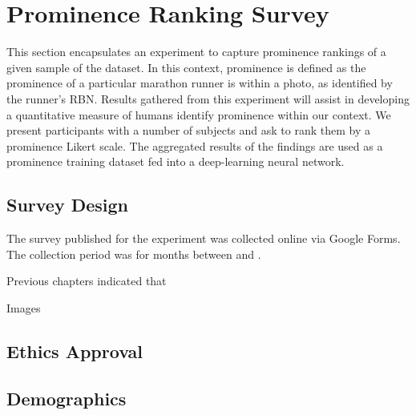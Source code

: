 \section{Prominence Ranking Survey}
\label{sec:prominence_rank_survey}

This section encapsulates an experiment to capture prominence rankings of a given sample of the dataset.
In this context, prominence is defined as the prominence of a particular marathon runner is within a photo, as identified by the runner's RBN.  
Results gathered from this experiment will assist in developing a quantitative measure of humans identify prominence within our context.
We present participants with a number of subjects and ask to rank them by a prominence Likert scale.
The aggregated results of the findings are used as a prominence training dataset fed into a deep-learning neural network.

\subsection{Survey Design}
\label{sec:prominence_rank_survey_design}

The survey published for the experiment was collected online via Google Forms. The collection period was for  months between  and .

Previous chapters indicated that 

Images


\subsection{Ethics Approval}




\subsection{Demographics}